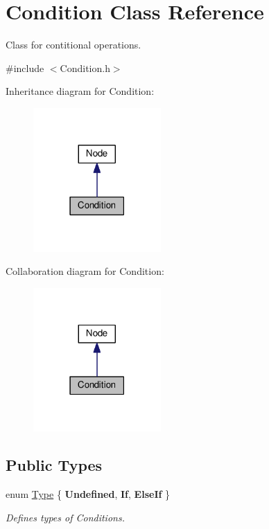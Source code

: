 \hypertarget{classCondition}{}\section{Condition Class Reference}
\label{classCondition}


Class for contitional operations.  




{\ttfamily \#include $<$Condition.\+h$>$}



Inheritance diagram for Condition\+:\nopagebreak
\begin{figure}[H]
\begin{center}
\leavevmode
\includegraphics[width=138pt]{classCondition__inherit__graph}
\end{center}
\end{figure}


Collaboration diagram for Condition\+:\nopagebreak
\begin{figure}[H]
\begin{center}
\leavevmode
\includegraphics[width=138pt]{classCondition__coll__graph}
\end{center}
\end{figure}
\subsection*{Public Types}
\begin{DoxyCompactItemize}
\item 
\hypertarget{classCondition_a3eed4b7ef94da5dda4a3353cffa8266e}{}enum \hyperlink{classCondition_a3eed4b7ef94da5dda4a3353cffa8266e}{Type} \{ {\bfseries Undefined}, 
{\bfseries If}, 
{\bfseries Else\+If}
 \}\label{classCondition_a3eed4b7ef94da5dda4a3353cffa8266e}

\begin{DoxyCompactList}\small\item\em Defines types of Conditions. \end{DoxyCompactList}\end{DoxyCompactItemize}
